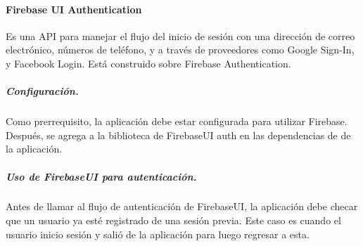 \paragraph{Firebase UI Authentication}
\label{\detokenize{dev_docs:firebase-ui-authentication}}

Es una API para manejar el flujo del inicio de sesión con una
dirección de correo electrónico, números de teléfono, y a través de
proveedores como Google Sign-In, y Facebook Login. Está construido sobre
Firebase Authentication.



\subparagraph{Configuración.}
\label{\detokenize{dev_docs:configuracion}}
Como prerrequisito, la aplicación debe estar configurada para utilizar Firebase.
Después, se agrega a la biblioteca de FirebaseUI auth en las dependencias de
 de la aplicación.

%
\begin{sphinxVerbatim}[commandchars=\\\{\}]
 
   
\end{sphinxVerbatim}


\subparagraph{Uso de FirebaseUI para autenticación.}
\label{\detokenize{dev_docs:uso-de-firebaseui-para-autenticacion}}
Antes de llamar al flujo de autenticación de FirebaseUI, la aplicación debe
checar que un usuario ya esté registrado de una sesión previa. Este caso
es cuando el usuario inicio sesión y salió de la aplicación para luego regresar
a esta.

%
\begin{sphinxVerbatim}[commandchars=\\\{\}]
   
    
  
\end{sphinxVerbatim}

